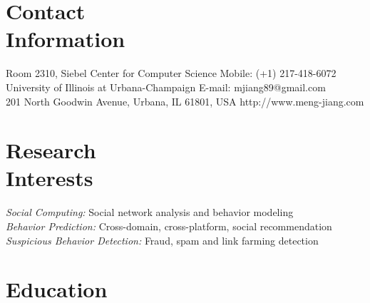 \documentclass[margin, 10pt]{res} %
\begin{document}
\begin{resume}


\section{Contact \\ Information}

{Room 2310, Siebel Center for Computer Science} \hfill {Mobile:} {(+1) 217-418-6072} \\
{University of Illinois at Urbana-Champaign} \hfill {E-mail:} {mjiang89@gmail.com} \\
{201 North Goodwin Avenue, Urbana, IL 61801, USA} \hfill {http://www.meng-jiang.com}


\section{Research \\ Interests}

{\em Social Computing:} Social network analysis and behavior modeling \\
{\em Behavior Prediction:} Cross-domain, cross-platform, social recommendation \\
{\em Suspicious Behavior Detection:} Fraud, spam and link farming detection


\section{Education}


\end{resume}
\end{document}
